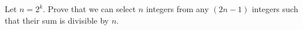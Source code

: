 Let $n = 2^k$. Prove that we can select $n$ integers from any $(2n - 1)$ integers such that their sum is divisible by $n$.
